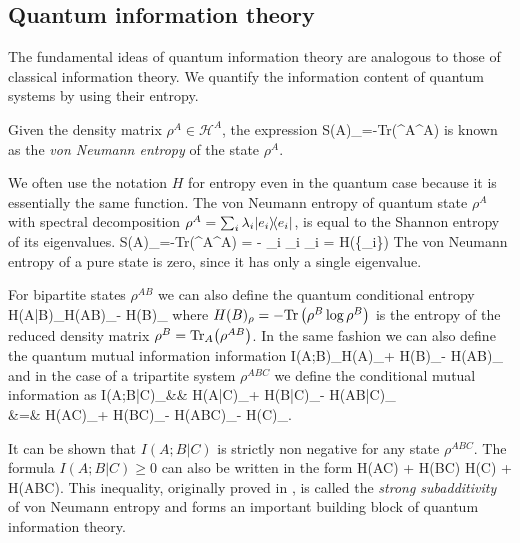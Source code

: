 \documentclass[aps,11pt,twoside,letterpaper]{article}
\def\Tr{\textup{Tr}}
\def\cH{\mathcal{H}}
\begin{document}
		
	\subsection{Quantum information theory}
	
		The fundamental ideas of quantum information theory are analogous to those of classical information theory. 
		We quantify the information content of quantum systems 
		by using their entropy.
		
		\begin{definition} 
			Given the density matrix $\rho^A \in \cH^A$, the expression
			\be
				S(A)_\rho=-\Tr\left(\rho^A\log\rho^A\right)
			\ee
			is known as the \emph{von Neumann entropy} of the state $\rho^A$. 
		\end{definition}
		
	            We often use the notation $H$ for entropy even in the quantum case because it is essentially
	            the same function.
	            The von Neumann entropy of quantum state $\rho^A$ 
	            with spectral decomposition $\rho^A = \sum_i \lambda_i | e_i \rangle\!\langle e_i |$, is
	            equal to the Shannon entropy of its eigenvalues.
	            \be
		            S(A)_\rho=-\Tr\left(\rho^A\log\rho^A\right) = - \sum_i \lambda_i \log \lambda_i = H(\{\lambda_i\})
	            \ee
  		   The von Neumann entropy of a pure state is zero, since it has only a single eigenvalue.

			
			For bipartite states $\rho^{AB}$ we can also define the quantum conditional entropy
			\be
				H(A|B)_\rho 	\triangleq 		H(AB)_\rho - H(B)_\rho					\label{cond-entrpy} 
			\ee
			where $H(B)_\rho = -\Tr\left(\rho^B\log\rho^B\right)$ is the entropy of the reduced density matrix
			$\rho^B = \Tr_A\!\left( \rho^{AB}\right)$. In the same fashion we can also define the 
			quantum mutual information information
			\be
				I(A;B)_\rho 	\triangleq		H(A)_\rho + H(B)_\rho - H(AB)_\rho 
			\ee
			and in the case of a tripartite system $\rho^{ABC}$ we define the conditional mutual information 
			as 
			\bea
				I(A;B|C)_\rho 	&\triangleq&	H(A|C)_\rho + H(B|C)_\rho - H(AB|C)_\rho \label{cond-mut-info} \\
								&=&		H(AC)_\rho + H(BC)_\rho - H(ABC)_\rho - H(C)_\rho.
			\eea
		    
			\noindent It can be shown that $I(A;B|C)$ is strictly non negative for any state $\rho^{ABC}$.
			The formula $I(A;B|C)\geq 0$ can also be written in the form
			\be	\label{strong-subadditivity}
				H(AC) + H(BC) 	\geq	H(C) + H(ABC).
			\ee
			This inequality, originally proved in \cite{LR73}, is called the \emph{strong subadditivity} of von Neumann 
			entropy and forms an important building block of quantum information theory.
			
\end{document}

